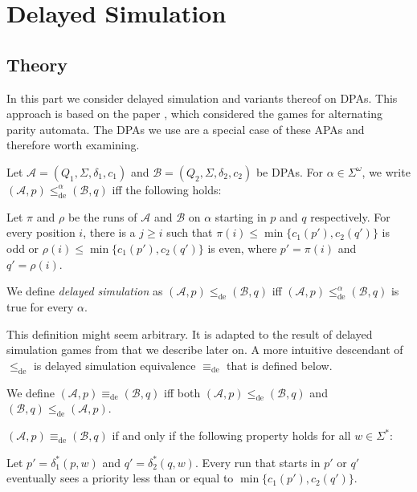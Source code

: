 
\chapter{Delayed Simulation}
\label{chap:fritzwilke}

\section{Theory}

In this part we consider delayed simulation and variants thereof on DPAs. This approach is based on the paper \cite{FritzWilke06}, which considered the games for alternating parity automata. The DPAs we use are a special case of these APAs and therefore worth examining.

\begin{defn}
	Let $\mathcal{A} = (Q_1, \Sigma, \delta_1, c_1)$ and $\mathcal{B} = (Q_2, \Sigma, \delta_2, c_2)$ be DPAs. For $\alpha \in \Sigma^\omega$, we write $(\mathcal{A}, p) \leq_\text{de}^\alpha (\mathcal{B}, q)$ iff the following holds:
	
	Let $\pi$ and $\rho$ be the runs of $\mathcal{A}$ and $\mathcal{B}$ on $\alpha$ starting in $p$ and $q$ respectively. For every position $i$, there is a $j \geq i$ such that $\pi(i) \leq \min \{c_1(p'), c_2(q')\}$ is odd or $\rho(i) \leq \min \{c_1(p'), c_2(q')\}$ is even, where $p' = \pi(i)$ and $q' = \rho(i)$.
	
	We define \emph{delayed simulation} as $(\mathcal{A}, p) \leq_\text{de} (\mathcal{B}, q)$ iff $(\mathcal{A}, p) \leq_\text{de}^\alpha (\mathcal{B}, q)$ is true for every $\alpha$.
\end{defn}

This definition might seem arbitrary. It is adapted to the result of delayed simulation games from \cite{FritzWilke06} that we describe later on. A more intuitive descendant of $\leq_\text{de}$ is delayed simulation equivalence $\equiv_\text{de}$ that is defined below.

\begin{defn}
	We define $(\mathcal{A}, p) \equiv_\text{de} (\mathcal{B}, q)$ iff both $(\mathcal{A}, p) \leq_\text{de} (\mathcal{B}, q)$ and $(\mathcal{B}, q) \leq_\text{de} (\mathcal{A}, p)$.
\end{defn}

\begin{lem}
	\label{lem:fritzwilke:equivde_alternative}
	$(\mathcal{A}, p) \equiv_\text{de} (\mathcal{B}, q)$ if and only if the following property holds for all $w \in \Sigma^*$: 
	
	Let $p' = \delta_1^*(p, w)$ and $q' = \delta_2^*(q, w)$. Every run that starts in $p'$ or $q'$ eventually sees a priority less than or equal to $\min \{c_1(p'), c_2(q')\}$.
\end{lem}

